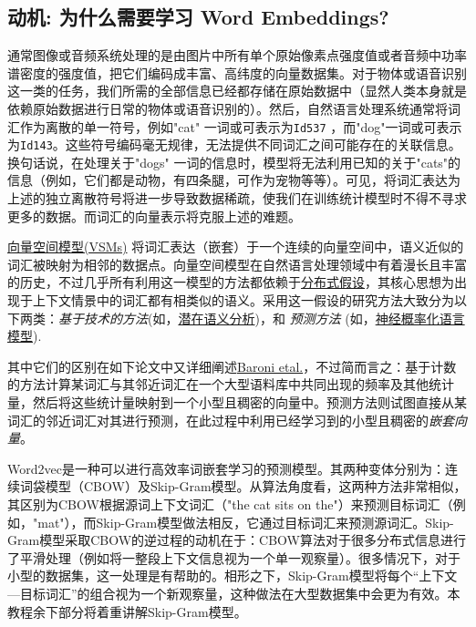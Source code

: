 \subsection{动机: 为什么需要学习 Word Embeddings?}\label{ux52a8}

通常图像或音频系统处理的是由图片中所有单个原始像素点强度值或者音频中功率谱密度的强度值，把它们编码成丰富、高纬度的向量数据集。对于物体或语音识别这一类的任务，我们所需的全部信息已经都存储在原始数据中（显然人类本身就是依赖原始数据进行日常的物体或语音识别的）。然后，自然语言处理系统通常将词汇作为离散的单一符号，例如"cat" 一词或可表示为\lstinline{Id537} ，而"dog"一词或可表示为\lstinline{Id143}。这些符号编码毫无规律，无法提供不同词汇之间可能存在的关联信息。换句话说，在处理关于"dogs" 一词的信息时，模型将无法利用已知的关于"cats"的信息（例如，它们都是动物，有四条腿，可作为宠物等等）。可见，将词汇表达为上述的独立离散符号将进一步导致数据稀疏，使我们在训练统计模型时不得不寻求更多的数据。而词汇的向量表示将克服上述的难题。

\href{https://en.wikipedia.org/wiki/Vector_space_model}{向量空间模型(VSMs)}
将词汇表达（嵌套）于一个连续的向量空间中，语义近似的词汇被映射为相邻的数据点。向量空间模型在自然语言处理领域中有着漫长且丰富的历史，不过几乎所有利用这一模型的方法都依赖于\href{https://en.wikipedia.org/wiki/Distributional_semantics\#Distributional_Hypothesis}{分布式假设}，其核心思想为出现于上下文情景中的词汇都有相类似的语义。采用这一假设的研究方法大致分为以下两类：\emph{基于技术的方法}(如，\href{https://en.wikipedia.org/wiki/Latent_semantic_analysis}{潜在语义分析})，和 \emph{预测方法} (如，\href{http://www.scholarpedia.org/article/Neural_net_language_models}{神经概率化语言模型}).

其中它们的区别在如下论文中又详细阐述\href{http://clic.cimec.unitn.it/marco/publications/acl2014/baroni-etal-countpredict-acl2014.pdf}{Baroni
etal.}，不过简而言之：基于计数的方法计算某词汇与其邻近词汇在一个大型语料库中共同出现的频率及其他统计量，然后将这些统计量映射到一个小型且稠密的向量中。预测方法则试图直接从某词汇的邻近词汇对其进行预测，在此过程中利用已经学习到的小型且稠密的\emph{嵌套向量}。

Word2vec是一种可以进行高效率词嵌套学习的预测模型。其两种变体分别为：连续词袋模型（CBOW）及Skip-Gram模型。从算法角度看，这两种方法非常相似，其区别为CBOW根据源词上下文词汇（"the cat sits on the"）来预测目标词汇（例如，"mat"），而Skip-Gram模型做法相反，它通过目标词汇来预测源词汇。Skip-Gram模型采取CBOW的逆过程的动机在于：CBOW算法对于很多分布式信息进行了平滑处理（例如将一整段上下文信息视为一个单一观察量）。很多情况下，对于小型的数据集，这一处理是有帮助的。相形之下，Skip-Gram模型将每个“上下文---目标词汇”的组合视为一个新观察量，这种做法在大型数据集中会更为有效。本教程余下部分将着重讲解Skip-Gram模型。

